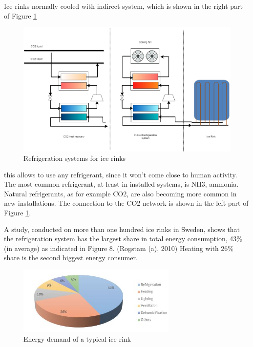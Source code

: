 \documentclass{article}
\begin{document}
Ice rinks normally cooled with indirect system, which is shown in the right part of Figure \ref{fig:IR_refSystem}

\begin{figure}[h!]
\centering
\includegraphics[width=1\textwidth]{IceRink_refrigeration.png}
\caption{Refrigeration systems for ice rinks}
\label{fig:IR_refSystem}
\end{figure}

this allows to use any refrigerant, since it won't come close to human activity. The most common refrigerant, at least in installed systems, is NH3, ammonia. Natural refrigerants, as for example CO2, are also becoming more common in new installations. 
The connection to the CO2 network is shown in the left part of Figure \ref{fig:IR_refSystem}.

A study, conducted on more than one hundred ice rinks in Sweden, shows that the refrigeration system has the largest share in total energy consumption, 43\% (in average) as indicated in Figure 8. (Rogstam (a), 2010) Heating with 26\% share is the second biggest energy consumer.
\cite{karampourMEASUREMENTMODELLINGICE}

\begin{figure}[h!]
\centering
\includegraphics[width=0.7\textwidth]{IR_energyDemand.JPG}
\caption{Energy demand of a typical ice rink \cite{karampourMEASUREMENTMODELLINGICE}}
\label{fig:IR_energyDemand}
\end{figure}
\end{document}

